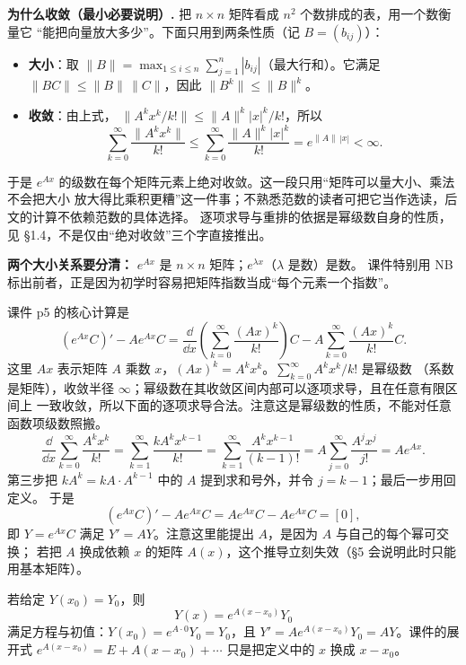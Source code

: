\documentclass[11pt]{ctexart}
\newcommand{\zero}{[0]}
\newcommand{\Ax}{Ax}
\begin{document}
\textbf{为什么收敛（最小必要说明）.} 把 $n\times n$ 矩阵看成 $n^2$ 个数排成的表，用一个数衡量它
“能把向量放大多少”。下面只用到两条性质（记 $B=(b_{ij})$）：
\begin{itemize}
  \item \textbf{大小}：取 $\|B\|=\max_{1\le i\le n}\sum_{j=1}^n|b_{ij}|$（最大行和）。它满足
        $\|BC\|\le\|B\|\,\|C\|$，因此 $\|B^k\|\le\|B\|^k$。
  \item \textbf{收敛}：由上式，
        $\|A^kx^k/k!\|\le\|A\|^k|x|^k/k!$，所以
        \[
        \sum_{k=0}^{\infty}\frac{\|A^kx^k\|}{k!}
        \le\sum_{k=0}^{\infty}\frac{\|A\|^k|x|^k}{k!}
        =e^{\|A\|\,|x|}<\infty .
        \]
\end{itemize}
于是 $e^{Ax}$ 的级数在每个矩阵元素上绝对收敛。这一段只用“矩阵可以量大小、乘法不会把大小
放大得比乘积更糟”这一件事；不熟悉范数的读者可把它当作选读，后文的计算不依赖范数的具体选择。
逐项求导与重排的依据是幂级数自身的性质，见 §1.4，不是仅由“绝对收敛”三个字直接推出。

\textbf{两个大小关系要分清：} $e^{Ax}$ 是 $n\times n$ 矩阵；$e^{\lambda x}$（$\lambda$ 是数）是数。
课件特别用 NB 标出前者，正是因为初学时容易把矩阵指数当成“每个元素一个指数”。


课件 p5 的核心计算是
\[
\left(e^{Ax}C\right)'-Ae^{Ax}C
=\frac{\dd}{\dd x}\left(\sum_{k=0}^{\infty}\frac{(\Ax)^k}{k!}\right)C
-A\sum_{k=0}^{\infty}\frac{(\Ax)^k}{k!}C .
\]
这里 $\Ax$ 表示矩阵 $A$ 乘数 $x$，$(\Ax)^k=A^kx^k$。$\sum_{k=0}^{\infty}A^kx^k/k!$ 是幂级数
（系数是矩阵），收敛半径 $\infty$；幂级数在其收敛区间内部可以逐项求导，且在任意有限区间上
一致收敛，所以下面的逐项求导合法。注意这是幂级数的性质，不能对任意函数项级数照搬。
\[
\frac{\dd}{\dd x}\sum_{k=0}^{\infty}\frac{A^kx^k}{k!}
=\sum_{k=1}^{\infty}\frac{kA^kx^{k-1}}{k!}
=\sum_{k=1}^{\infty}\frac{A^k x^{k-1}}{(k-1)!}
=A\sum_{j=0}^{\infty}\frac{A^jx^j}{j!}=Ae^{Ax}.
\]
第三步把 $kA^k=kA\cdot A^{k-1}$ 中的 $A$ 提到求和号外，并令 $j=k-1$；最后一步用回定义。
于是
\[
\left(e^{Ax}C\right)'-Ae^{Ax}C=Ae^{Ax}C-Ae^{Ax}C=\zero,
\]
即 $Y=e^{Ax}C$ 满足 $Y'=AY$。注意这里能提出 $A$，是因为 $A$ 与自己的每个幂可交换；
若把 $A$ 换成依赖 $x$ 的矩阵 $A(x)$，这个推导立刻失效（§5 会说明此时只能用基本矩阵）。


若给定 $Y(x_0)=Y_0$，则
\begin{equation}\label{eq:ivp}
Y(x)=e^{A(x-x_0)}Y_0
\end{equation}
满足方程与初值：$Y(x_0)=e^{A\cdot0}Y_0=Y_0$，且
$Y'=Ae^{A(x-x_0)}Y_0=AY$。课件的展开式
$e^{A(x-x_0)}=E+A(x-x_0)+\cdots$ 只是把定义中的 $x$ 换成 $x-x_0$。
\end{document}
